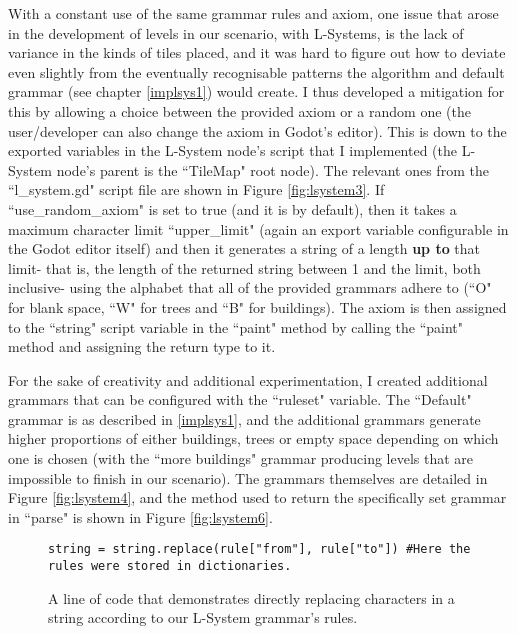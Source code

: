 With a constant use of the same grammar rules and axiom, one issue that arose in the development of levels in our scenario, with L-Systems, is the lack of variance in the kinds of tiles placed, and it was hard to figure out how to deviate even slightly from the eventually recognisable patterns the algorithm and default grammar (see chapter \ref{implsys1}) would create. I thus developed a mitigation for this by allowing a choice between the provided axiom or a random one (the user/developer can also change the axiom in Godot's editor). This is down to the exported variables in the L-System node's script that I implemented (the L-System node's parent is the ``TileMap" root node). The relevant ones from the ``l\_system.gd" script file are shown in Figure \ref{fig:lsystem3}. If ``use\_random\_axiom" is set to true (and it is by default), then it takes a maximum character limit ``upper\_limit" (again an export variable configurable in the Godot editor itself) and then it generates a string of a length \textbf{up to} that limit- that is, the length of the returned string between 1 and the limit, both inclusive- using the alphabet that all of the provided grammars adhere to (``O" for blank space, ``W" for trees and ``B" for buildings). The axiom is then assigned to the ``string" script variable in the ``paint" method by calling the ``paint" method and assigning the return type to it.

For the sake of creativity and additional experimentation, I created additional grammars that can be configured with the ``ruleset" variable. The ``Default" grammar is as described in \ref{implsys1}, and the additional grammars generate higher proportions of either buildings, trees or empty space depending on which one is chosen (with the ``more buildings" grammar producing levels that are impossible to finish in our scenario). The grammars themselves are detailed in Figure \ref{fig:lsystem4}, and the method used to return the specifically set grammar in ``parse" is shown in Figure \ref{fig:lsystem6}.

\begin{figure}[H]
    \centering
    \begin{lstlisting}
string = string.replace(rule["from"], rule["to"]) #Here the rules were stored in dictionaries.
    \end{lstlisting}
    \caption{A line of code that demonstrates directly replacing characters in a string according to our L-System grammar's rules.}
    \label{fig:lsystem1}
\end{figure}

